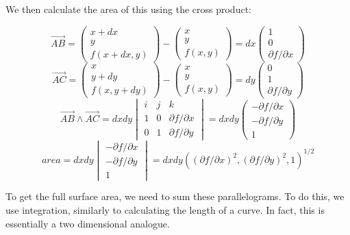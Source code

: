 \documentclass[a4paper,10pt]{article}
\begin{document}
We then calculate the area of this using the cross product:

\[
	\vec{AB} =
	\begin{pmatrix}
		x+dx \\
		y \\
		f(x+dx,y)
	\end{pmatrix}
	-
	\begin{pmatrix}
		x \\
		y \\
		f(x,y)
	\end{pmatrix}
	=
	dx
	\begin{pmatrix}
		1 \\
		0 \\
		\partial f / \partial x
	\end{pmatrix}
\]
\[
	\vec{AC} =
	\begin{pmatrix}
		x \\
		y+dy \\
		f(x,y+dy)
	\end{pmatrix}
	-
	\begin{pmatrix}
		x \\
		y \\
		f(x,y)
	\end{pmatrix}
	=
	dy
	\begin{pmatrix}
		0 \\
		1 \\
		\partial f / \partial y
	\end{pmatrix}
\]
\[
	\vec{AB} \wedge \vec{AC} =
	dxdy
	\begin{vmatrix}
		i & j & k \\
		1 & 0 & \partial f / \partial x \\
		0 & 1 & \partial f / \partial y
	\end{vmatrix}
	=
	dxdy
	\begin{pmatrix}
		- \partial f / \partial x \\
		- \partial f / \partial y \\
		1
	\end{pmatrix}
\]
\[
	area = dxdy
	\begin{vmatrix}
		- \partial f / \partial x \\
		- \partial f / \partial y \\
		1
	\end{vmatrix}
	=
	dxdy
	\left(
		(\partial f / \partial x)^2,
		(\partial f / \partial y)^2,
		1
	\right)^{1/2}
\]

To get the full surface area, we need to sum these parallelograms. To do
this, we use integration, similarly to calculating the length of a
curve. In fact, this is essentially a two dimensional analogue.
\end{document}

